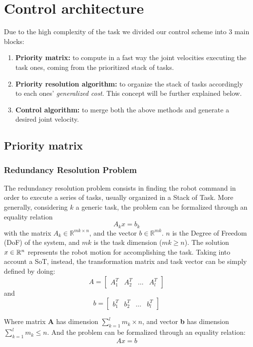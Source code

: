 \documentclass[12pt, a4paper]{article}
\newcommand{\R}{\mathbb{R}}
\begin{document}
\section{Control architecture}
Due to the high complexity of the task we divided our control scheme into 3 main blocks:
\begin{enumerate}
	\item \textbf{Priority matrix:} to compute in a fast way the joint velocities executing the task ones, coming from the prioritized stack of tasks.
	\item \textbf{Priority resolution algorithm:} to organize the stack of tasks accordingly to each ones' \textit{generalized cost}.
	This concept will be further explained below.
	\item \textbf{Control algorithm:} to merge both the above methods and generate a desired joint velocity.
\end{enumerate}

\subsection{Priority matrix}
\subsubsection{Redundancy Resolution Problem}
The redundancy resolution problem consists in finding the robot command in order to execute a series of tasks, usually organized in a Stack of Task.
More generally, considering $k$ a generic task, the problem can be formalized through an equality relation \[A_kx=b_k\]
with the matrix $A_k \in \R^{mk \times n}$, and the vector $b \in \R^{mk}$. $n$ is the Degree of Freedom (DoF) of the system, and $mk$ is the task dimension ($mk \geq n$). The solution $x \in \Bbb R^n$ represents the robot motion for accomplishing the task.
Taking into account a SoT, instead, the transformation matrix and task vector can be simply defined by doing:
\[A=\begin{bmatrix}
A_1^T & A_2^T & \dots & A_l^T
\end{bmatrix}
\]
and
\[b=\begin{bmatrix}
b_1^T & b_2^T & \dots & b_l^T
\end{bmatrix}
\]

Where matrix \textbf{A} has dimension $\sum_{k=1}^l m_k \times n$, and vector \textbf{b} has dimension $\sum_{k=1}^l m_k \leq n$.
And the problem can be formalized through an equality relation: \[Ax = b\]
\end{document}
